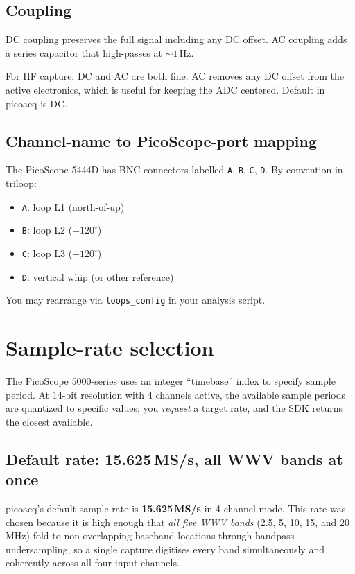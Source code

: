 \documentclass[11pt]{article}
\begin{document}
\subsection{Coupling}

DC coupling preserves the full signal including any DC offset.  AC
coupling adds a series capacitor that high-passes at $\sim 1$\,Hz.

For HF capture, DC and AC are both fine.  AC removes any DC offset
from the active electronics, which is useful for keeping the ADC
centered.  Default in \textsf{picoacq} is DC.

\subsection{Channel-name to PicoScope-port mapping}

The PicoScope 5444D has BNC connectors labelled \texttt{A},
\texttt{B}, \texttt{C}, \texttt{D}.  By convention in \textsf{triloop}:
\begin{itemize}\itemsep=2pt
\item \texttt{A}: loop L1 (north-of-up)
\item \texttt{B}: loop L2 ($+120^\circ$)
\item \texttt{C}: loop L3 ($-120^\circ$)
\item \texttt{D}: vertical whip (or other reference)
\end{itemize}
You may rearrange via \texttt{loops\_config} in your analysis script.

\section{Sample-rate selection}
\label{sec:rate}

The PicoScope 5000-series uses an integer ``timebase'' index to specify
sample period.  At 14-bit resolution with 4 channels active, the
available sample periods are quantized to specific values; you
\emph{request} a target rate, and the SDK returns the closest available.

\subsection{Default rate: 15.625\,MS/s, all WWV bands at once}
\label{sec:defaultrate}

\textsf{picoacq}'s default sample rate is \textbf{15.625\,MS/s} in
4-channel mode.  This rate was chosen because it is high enough that
\emph{all five WWV bands} (2.5, 5, 10, 15, and 20\,MHz) fold to
non-overlapping baseband locations through bandpass undersampling, so
a single capture digitises every band simultaneously and coherently
across all four input channels.
\end{document}
